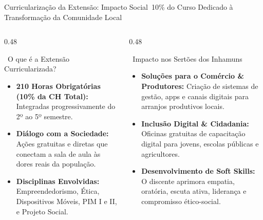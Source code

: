 \begin{frame}{Curricularização da Extensão: Impacto Social}{\faHandsHelping\ 10\% do Curso Dedicado à Transformação da Comunidade Local}
  \begin{columns}[t]
    \begin{column}{0.48\textwidth}
      \begin{greencard}{\faHandHoldingHeart\ O que é a Extensão Curricularizada?}
        \begin{itemize}\setlength{\itemsep}{0.35em}\footnotesize
          \item \textbf{210 Horas Obrigatórias (10\% da CH Total):} Integradas progressivamente do 2º ao 5º semestre.
          \item \textbf{Diálogo com a Sociedade:} Ações gratuitas e diretas que conectam a sala de aula às dores reais da população.
          \item \textbf{Disciplinas Envolvidas:} Empreendedorismo, Ética, Dispositivos Móveis, PIM I e II, e Projeto Social.
        \end{itemize}
      \end{greencard}
    \end{column}
    
    \begin{column}{0.48\textwidth}
      \begin{bluecard}{\faCity\ Impacto nos Sertões dos Inhamuns}
        \begin{itemize}\setlength{\itemsep}{0.35em}\footnotesize
          \item \textbf{Soluções para o Comércio \& Produtores:} Criação de sistemas de gestão, apps e canais digitais para arranjos produtivos locais.
          \item \textbf{Inclusão Digital \& Cidadania:} Oficinas gratuitas de capacitação digital para jovens, escolas públicas e agricultores.
          \item \textbf{Desenvolvimento de Soft Skills:} O discente aprimora empatia, oratória, escuta ativa, liderança e compromisso ético-social.
        \end{itemize}
      \end{bluecard}
    \end{column}
  \end{columns}
\end{frame}
